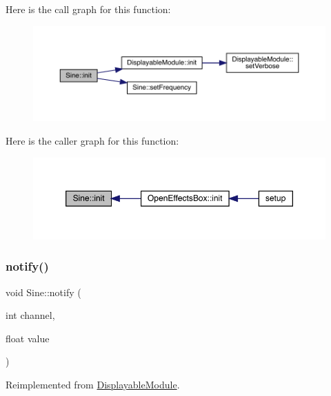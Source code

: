 Here is the call graph for this function\+:\nopagebreak
\begin{figure}[H]
\begin{center}
\leavevmode
\includegraphics[width=350pt]{class_sine_a14a59e91ed90f357c3d28bd9f0433ddb_cgraph}
\end{center}
\end{figure}
Here is the caller graph for this function\+:\nopagebreak
\begin{figure}[H]
\begin{center}
\leavevmode
\includegraphics[width=350pt]{class_sine_a14a59e91ed90f357c3d28bd9f0433ddb_icgraph}
\end{center}
\end{figure}
\mbox{\label{class_sine_a91e8327318758647ea3e0f856eb3eb60}} 
\subsubsection{\texorpdfstring{notify()}{notify()}}
{\footnotesize\ttfamily void Sine\+::notify (\begin{DoxyParamCaption}\item[{int}]{channel,  }\item[{float}]{value }\end{DoxyParamCaption})\hspace{0.3cm}{\ttfamily [virtual]}}



Reimplemented from \mbox{\hyperlink{class_displayable_module_a8ae5383931f10c54cff2feef2bc07dee}{Displayable\+Module}}.

